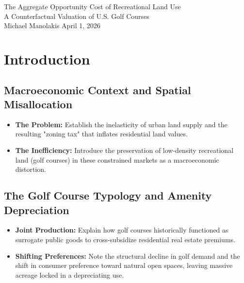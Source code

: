 \documentclass[10pt, letterpaper]{article}
\begin{document}
\begin{center}
    {\huge The Aggregate Opportunity Cost of Recreational Land Use \\}
    {\large A Counterfactual Valuation of U.S. Golf Courses \\}
    {\normalsize Michael Manolakis \textbf{\textemdash} April 1, 2026 \\}
\end{center}

\raggedright

\vspace{1cm}

\begin{abstract}
    \textit{[Placeholder: 228-word summary detailing the macroeconomic inefficiency of golf courses, the HBU methodology, the MICE imputation of 16,297 facilities, the \$244.9B pooled result, and the institutional frictions of zoning and covenants.]}
\end{abstract}

\vspace{1cm}

\section{Introduction}

\subsection{Macroeconomic Context and Spatial Misallocation}
\begin{itemize}
    \item \textbf{The Problem:} Establish the inelasticity of urban land supply and the resulting "zoning tax" that inflates residential land values.
    \item \textbf{The Inefficiency:} Introduce the preservation of low-density recreational land (golf courses) in these constrained markets as a macroeconomic distortion.
\end{itemize}

\subsection{The Golf Course Typology and Amenity Depreciation}
\begin{itemize}
    \item \textbf{Joint Production:} Explain how golf courses historically functioned as surrogate public goods to cross-subsidize residential real estate premiums.
    \item \textbf{Shifting Preferences:} Note the structural decline in golf demand and the shift in consumer preference toward natural open spaces, leaving massive acreage locked in a depreciating use.
\end{itemize}
\end{document}
